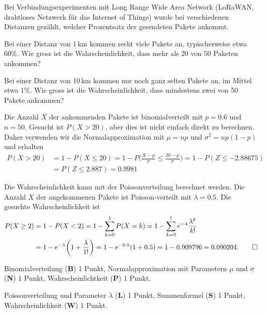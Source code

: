 Bei Verbindungsexperimenten mit Long Range Wide Area Network (LoRaWAN, 
drahtloses Netzwerk für das Internet of Things)
wurde bei verschiedenen Distanzen gezählt, welcher Prozentsatz der
gesendeten Pakete ankommt.
\begin{teilaufgaben}
\item
Bei einer Distanz von 1\,km kommen recht viele Pakete an,
typischerweise etwa 60\%.
Wie gross ist die Wahrscheinlichkeit, dass mehr als 20 von 50 Paketen
ankommen?
\item
Bei einer Distanz von 10\,km kommen nur noch ganz selten Pakete an,
im Mittel etwa 1\%.
Wie gross ist die Wahrscheinlichkeit, dass mindestens zwei von 50 Pakete
ankommen?
\end{teilaufgaben}


\begin{loesung}
\begin{teilaufgaben}
\item
Die Anzahl $X$ der ankommenden Pakete ist binomialverteilt mit $p=0.6$ und
$n=50$.
Gesucht ist $P(X > 20)$, aber dies ist nicht einfach direkt zu berechnen.
Daher verwenden wir die Normalapproximation mit $\mu=np$ und $\sigma^2=np(1-p)$
und erhalten
\begin{align*}
P(X>20)
&=
1-P(X\le 20)
=
1- P\biggl( \frac{X-\mu}{\sigma}\le \frac{20-\mu}{\sigma}\biggr)
=
1-P(Z\le -2.88675)
\\
&=
P(Z\le 2.887)
=0.9981
\end{align*}
\item
Die Wahrscheinlichkeit kann mit der Poissonverteilung berechnet werden.
Die Anzahl $X$ der angekommenen Pakete ist Poisson-verteilt mit $\lambda=0.5$.
Die gesuchte Wahrscheinlichkeit ist
\begin{align*}
P(X\ge 2)
&=1-P(X < 2) = 1-\sum_{k=0}^1 P(X=k)
= 1-\sum_{k=0}^1 e^{-\lambda}\frac{\lambda^k}{k!}
\\
&= 1- e^{-\lambda}\biggl(1 + \frac{\lambda}{1!}\biggr)
= 1- e^{-0.5}(1+0.5)=1-0.909796=0.090204.
\qedhere
\end{align*}
\end{teilaufgaben}
\end{loesung}

\begin{bewertung}
\begin{teilaufgaben}
\item
Binomialverteilung ({\bf B}) 1 Punkt,
Normalapproximation mit Parametern $\mu$ und $\sigma$ ({\bf N}) 1 Punkt,
Wahrscheinlichtkeit ({\bf P}) 1 Punkt.
\item
Poissonverteilung und Parameter $\lambda$ ({\bf L}) 1 Punkt,
Summenformel ({\bf S}) 1 Punkt,
Wahrscheinlichkeit ({\bf W}) 1 Punkt.
\end{teilaufgaben}
\end{bewertung}



